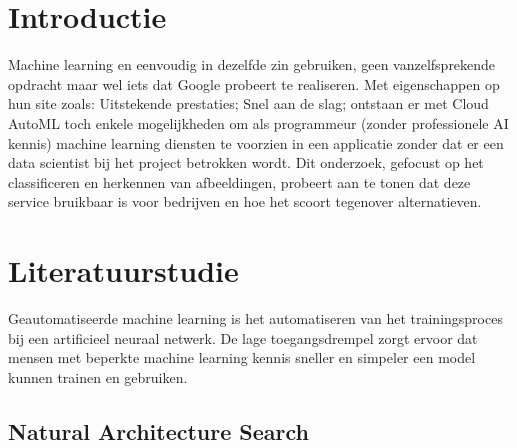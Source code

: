 
\section{Introductie} %
\label{sec:introductie}

Machine learning en eenvoudig in dezelfde zin gebruiken, geen vanzelfsprekende opdracht maar wel iets dat Google probeert te realiseren. Met eigenschappen op hun site \autocite{Google2019} zoals: Uitstekende prestaties; Snel aan de slag; ontstaan er met Cloud AutoML toch enkele mogelijkheden om als programmeur (zonder professionele AI kennis) machine learning diensten te voorzien in een applicatie zonder dat er een data scientist bij het project betrokken wordt. Dit onderzoek, gefocust op het classificeren en herkennen van afbeeldingen, probeert aan te tonen dat deze service bruikbaar is voor bedrijven en hoe het scoort tegenover alternatieven.


\section{Literatuurstudie}
\label{sec:literatuurstudie}


Geautomatiseerde machine learning is het automatiseren van het trainingsproces bij een artificieel neuraal netwerk. De lage toegangsdrempel zorgt ervoor dat mensen met beperkte machine learning kennis sneller en simpeler een model kunnen trainen en gebruiken.

\subsection{Natural Architecture Search}

